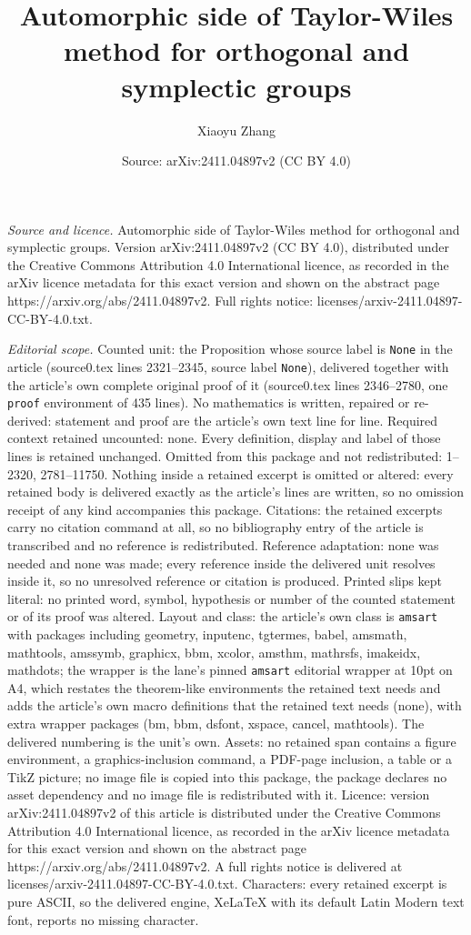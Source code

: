 \documentclass[10pt,a4paper]{amsart}
\title[Automorphic side of Taylor-Wiles method for orthogonal and s]{Automorphic side of Taylor-Wiles method for orthogonal and symplectic groups}
\author{Xiaoyu Zhang}
\date{Source: arXiv:2411.04897v2 (CC BY 4.0)}
\begin{document}
\maketitle

\noindent\emph{Source and licence.} Automorphic side of Taylor-Wiles method for orthogonal and symplectic groups. Version arXiv:2411.04897v2 (CC BY 4.0), distributed under the Creative Commons Attribution 4.0 International licence, as recorded in the arXiv licence metadata for this exact version and shown on the abstract page https://arxiv.org/abs/2411.04897v2. Full rights notice: licenses/arxiv-2411.04897-CC-BY-4.0.txt.\par\smallskip

\noindent\textit{Editorial scope.} Counted unit: the Proposition whose source label is \texttt{None} in the article (source0.tex lines 2321--2345, source label \texttt{None}), delivered together with the article's own complete original proof of it (source0.tex lines 2346--2780, one \texttt{proof} environment of 435 lines). No mathematics is written, repaired or re-derived: statement and proof are the article's own text line for line. Required context retained uncounted: none. Every definition, display and label of those lines is retained unchanged. Omitted from this package and not redistributed: 1--2320, 2781--11750. Nothing inside a retained excerpt is omitted or altered: every retained body is delivered exactly as the article's lines are written, so no omission receipt of any kind accompanies this package. Citations: the retained excerpts carry no citation command at all, so no bibliography entry of the article is transcribed and no reference is redistributed. Reference adaptation: none was needed and none was made; every reference inside the delivered unit resolves inside it, so no unresolved reference or citation is produced. Printed slips kept literal: no printed word, symbol, hypothesis or number of the counted statement or of its proof was altered. Layout and class: the article's own class is \texttt{amsart} with packages including geometry, inputenc, tgtermes, babel, amsmath, mathtools, amssymb, graphicx, bbm, xcolor, amsthm, mathrsfs, imakeidx, mathdots; the wrapper is the lane's pinned \texttt{amsart} editorial wrapper at 10pt on A4, which restates the theorem-like environments the retained text needs and adds the article's own macro definitions that the retained text needs (none), with extra wrapper packages (bm, bbm, dsfont, xspace, cancel, mathtools). The delivered numbering is the unit's own. Assets: no retained span contains a figure environment, a graphics-inclusion command, a PDF-page inclusion, a table or a TikZ picture; no image file is copied into this package, the package declares no asset dependency and no image file is redistributed with it. Licence: version arXiv:2411.04897v2 of this article is distributed under the Creative Commons Attribution 4.0 International licence, as recorded in the arXiv licence metadata for this exact version and shown on the abstract page https://arxiv.org/abs/2411.04897v2. A full rights notice is delivered at licenses/arxiv-2411.04897-CC-BY-4.0.txt. Characters: every retained excerpt is pure ASCII, so the delivered engine, XeLaTeX with its default Latin Modern text font, reports no missing character.
\end{document}

